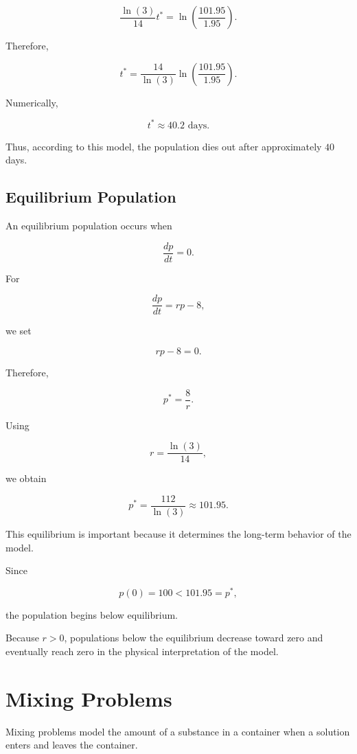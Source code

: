 \documentclass[11pt]{article}
\begin{document}
\[
\frac{\ln(3)}{14}t^*
=
\ln\left(\frac{101.95}{1.95}\right).
\]

Therefore,

\[
\boxed{
t^*
=
\frac{14}{\ln(3)}
\ln\left(\frac{101.95}{1.95}\right).
}
\]

Numerically,

\[
\boxed{
t^*\approx 40.2\text{ days}.
}
\]

Thus, according to this model, the population dies out after
approximately \(40\) days.

\subsection{Equilibrium Population}

An equilibrium population occurs when

\[
\frac{dp}{dt}=0.
\]

For

\[
\frac{dp}{dt}=rp-8,
\]

we set

\[
rp-8=0.
\]

Therefore,

\[
p^*=\frac{8}{r}.
\]

Using

\[
r=\frac{\ln(3)}{14},
\]

we obtain

\[
\boxed{
p^*
=
\frac{112}{\ln(3)}
\approx 101.95.
}
\]

This equilibrium is important because it determines the long-term
behavior of the model.

Since

\[
p(0)=100<101.95=p^*,
\]

the population begins below equilibrium.

Because \(r>0\), populations below the equilibrium decrease toward
zero and eventually reach zero in the physical interpretation of the
model.

\section{Mixing Problems}

Mixing problems model the amount of a substance in a container when
a solution enters and leaves the container.
\end{document}
